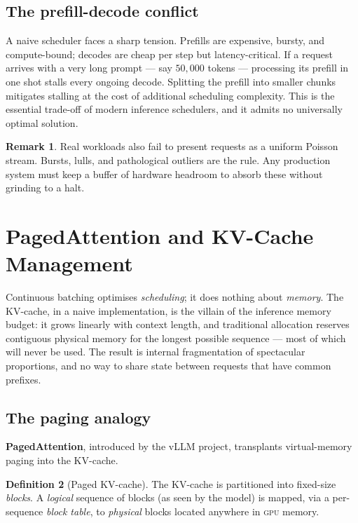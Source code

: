 \documentclass[11pt,a4paper]{article}
\theoremstyle{definition}
\newtheorem{definition}{Definition}[section]
\newtheorem{remark}[definition]{Remark}
\theoremstyle{plain}
\newcommand{\GPU}{\textsc{gpu}}
\begin{document}
\subsection{The prefill-decode conflict}

A naive scheduler faces a sharp tension. Prefills are expensive, bursty, and compute-bound; decodes are cheap per step but latency-critical. If a request arrives with a very long prompt --- say $50{,}000$ tokens --- processing its prefill in one shot stalls every ongoing decode. Splitting the prefill into smaller chunks mitigates stalling at the cost of additional scheduling complexity. This is the essential trade-off of modern inference schedulers, and it admits no universally optimal solution.

\begin{remark}
Real workloads also fail to present requests as a uniform Poisson stream. Bursts, lulls, and pathological outliers are the rule. Any production system must keep a buffer of hardware headroom to absorb these without grinding to a halt.
\end{remark}

\section{PagedAttention and KV-Cache Management}


Continuous batching optimises \emph{scheduling}; it does nothing about \emph{memory}. The KV-cache, in a naive implementation, is the villain of the inference memory budget: it grows linearly with context length, and traditional allocation reserves contiguous physical memory for the longest possible sequence --- most of which will never be used. The result is internal fragmentation of spectacular proportions, and no way to share state between requests that have common prefixes.

\subsection{The paging analogy}

\textbf{PagedAttention}, introduced by the vLLM project, transplants virtual-memory paging into the KV-cache.

\begin{definition}[Paged KV-cache]
The KV-cache is partitioned into fixed-size \emph{blocks}. A \emph{logical} sequence of blocks (as seen by the model) is mapped, via a per-sequence \emph{block table}, to \emph{physical} blocks located anywhere in \GPU{} memory.
\end{definition}
\end{document}
